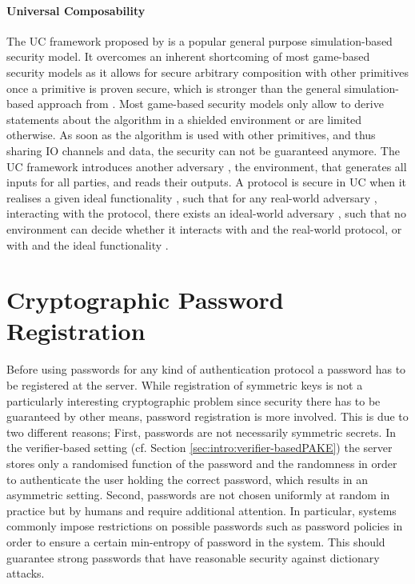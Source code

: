 \paragraph{Universal Composability} \label{sec:uc-intro}
The \ac{UC} framework proposed by \citet{Canetti2001a} is a popular general purpose simulation-based security model.
It overcomes an inherent shortcoming of most game-based security models as it allows for secure arbitrary composition with other primitives once a primitive is proven secure, which is stronger than the general simulation-based approach from \citet{Goldreich87}.
Most game-based security models only allow to derive statements about the algorithm in a shielded environment or are limited otherwise.
As soon as the algorithm is used with other primitives, and thus sharing \ac{IO} channels and data, the security can not be guaranteed anymore.
The \ac{UC} framework introduces another adversary \UCZ, the environment, that generates all inputs for all parties, and reads their outputs.
A protocol is secure in \ac{UC} when it realises a given ideal functionality \UCF, such that for any real-world adversary \A, interacting with the protocol, there exists an ideal-world adversary \UCS, such that no environment \UCZ can decide whether it interacts with \A and the real-world protocol, or with \UCS and the ideal functionality \UCF.



\section{Cryptographic Password Registration}\label{sec:intro:registration}
Before using passwords for any kind of authentication protocol a password has to be registered at the server.
While registration of symmetric keys is not a particularly interesting cryptographic problem since security there has to be guaranteed by other means, password registration is more involved.
This is due to two different reasons;
First, passwords are not necessarily symmetric secrets.
In the verifier-based setting (cf. Section \ref{sec:intro:verifier-basedPAKE}) the server stores only a randomised function of the password and the randomness in order to authenticate the user holding the correct password, which results in an asymmetric setting.
Second, passwords are not chosen uniformly at random in practice but by humans and require additional attention.
In particular, systems commonly impose restrictions on possible passwords such as password policies in order to ensure a certain min-entropy of password in the system.
This should guarantee strong passwords that have reasonable security against dictionary attacks.


